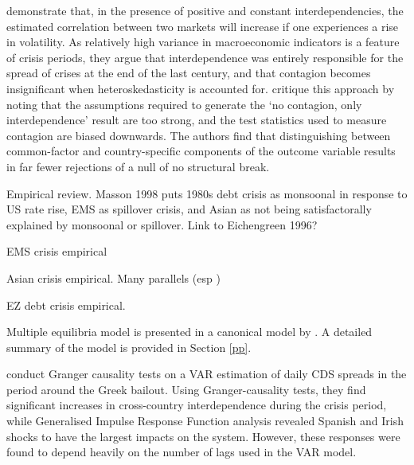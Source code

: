 \documentclass[../base.tex]{subfiles}
\begin{document}
\cite{forbes2002no} demonstrate that, in the presence of positive and constant interdependencies, the estimated correlation between two markets will increase if one experiences a rise in volatility. As relatively high variance in macroeconomic indicators is a feature of crisis periods, they argue that interdependence was entirely responsible for the spread of crises at the end of the last century, and that contagion becomes insignificant when heteroskedasticity is accounted for. \cite{corsetti2005some} critique this approach by noting that the assumptions required to generate the `no contagion, only interdependence' result are too strong, and the test statistics used to measure contagion are biased downwards. The authors find that distinguishing between common-factor and country-specific components of the outcome variable results in far fewer rejections of a null of no structural break. 


Empirical review. Masson 1998 puts 1980s debt crisis as monsoonal in response to US rate rise, EMS as spillover crisis, and Asian as not being satisfactorally explained by monsoonal or spillover. Link to Eichengreen 1996?

EMS crisis empirical

Asian crisis empirical. Many parallels (esp \cite{kaminsky1999twin})

EZ debt crisis empirical. 



Multiple equilibria model is presented in a canonical model by \cite{pesaran2007econometric}. A detailed summary of the model is provided in Section \ref{pp}.

\cite{kalbaska2012eurozone} conduct Granger causality tests on a VAR estimation of daily CDS spreads in the period around the Greek bailout. Using Granger-causality tests, they find significant increases in cross-country interdependence during the crisis period, while Generalised Impulse Response Function analysis revealed Spanish and Irish shocks to have the largest impacts on the system. However, these responses were found to depend heavily on the number of lags used in the VAR model.
\end{document}
